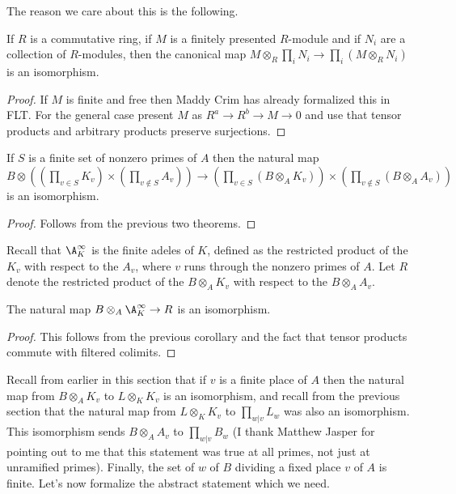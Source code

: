 The reason we care about this is the following.

\begin{theorem}
  \label{TODOtemplabel7}
  If $R$ is a commutative ring, if $M$ is a finitely presented $R$-module
  and if $N_i$ are a collection of $R$-modules, then the canonical map
  $M\otimes_R\prod_i N_i\to\prod_i(M\otimes_R N_i)$ is an isomorphism.
\end{theorem}
\begin{proof} If $M$ is finite and free then Maddy Crim has already formalized this
  in FLT. For the general case present $M$ as $R^a\to R^b\to M\to 0$ and use that tensor
  products and arbitrary products preserve surjections.
\end{proof}

\begin{corollary}
  \label{TODOtemplabel8}
  If $S$ is a finite set of nonzero primes of $A$ then the natural map
  $B\otimes((\prod_{v\in S}K_v)\times(\prod_{v\notin S}A_v))\to
  (\prod_{v\in S}(B\otimes_AK_v))\times(\prod_{v\notin S}(B\otimes_AA_v))$
  is an isomorphism.
\end{corollary}
\begin{proof} Follows from the previous two theorems.
\end{proof}

Recall that $\A_K^\infty$ is the finite adeles of $K$,
defined as the restricted product of the $K_v$ with respect to the $A_v$,
where $v$ runs through the nonzero primes of $A$. Let $R$ denote the restricted
product of the $B\otimes_A K_v$ with respect to the $B\otimes_A A_v$.

\begin{corollary}
  \label{TODOtemplabel9}
  The natural map $B\otimes_A\A_K^\infty\to R$ is an isomorphism.
\end{corollary}
\begin{proof} This follows from the previous corollary and the fact that
  tensor products commute with filtered colimits.
\end{proof}

Recall from earlier in this section that if $v$ is a finite place of $A$ then the natural map from
$B\otimes_A K_v$ to $L\otimes_KK_v$ is an isomorphism, and recall from the previous section
that the natural map from $L\otimes_KK_v$ to $\prod_{w|v}L_w$ was also an isomorphism.
This isomorphism sends $B\otimes_A A_v$ to $\prod_{w|v}B_w$ (I thank Matthew Jasper for
pointing out to me that this statement was true at all primes, not just at unramified primes).
Finally, the set of $w$ of $B$ dividing a fixed place $v$ of $A$ is finite.
Let's now formalize the abstract statement which we need.

